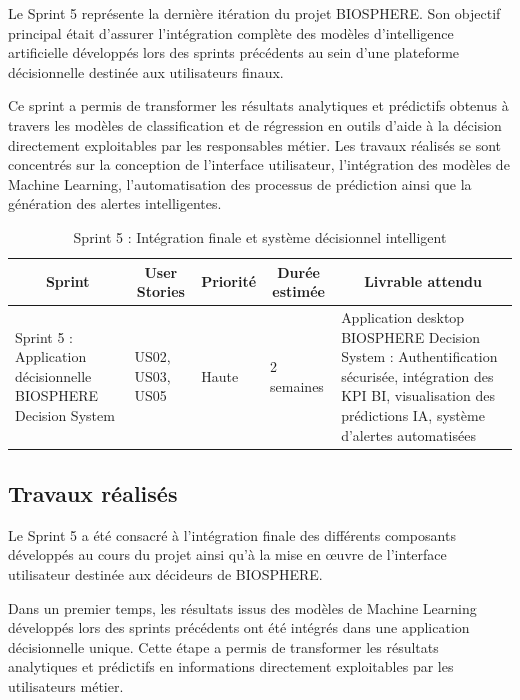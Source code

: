 Le Sprint 5 représente la dernière itération du projet BIOSPHERE. Son objectif principal était d'assurer l'intégration complète des modèles d'intelligence artificielle développés lors des sprints précédents au sein d'une plateforme décisionnelle destinée aux utilisateurs finaux.

Ce sprint a permis de transformer les résultats analytiques et prédictifs obtenus à travers les modèles de classification et de régression en outils d'aide à la décision directement exploitables par les responsables métier. Les travaux réalisés se sont concentrés sur la conception de l'interface utilisateur, l'intégration des modèles de Machine Learning, l'automatisation des processus de prédiction ainsi que la génération des alertes intelligentes.

\begin{table}[H]
\centering
\caption{Sprint 5 : Intégration finale et système décisionnel intelligent}
\label{tab:ch5:sprint5}
\small
\begin{tabular}{|p{3.5cm}|p{1.5cm}|p{1.5cm}|p{2.2cm}|p{5.5cm}|}
\hline
\multicolumn{1}{|c|}{\textbf{Sprint}} & 
\multicolumn{1}{c|}{\textbf{User Stories}} & 
\multicolumn{1}{c|}{\textbf{Priorité}} & 
\multicolumn{1}{c|}{\textbf{Durée estimée}} & 
\multicolumn{1}{c|}{\textbf{Livrable attendu}} \\
\hline
Sprint 5 : Application décisionnelle BIOSPHERE Decision System & US02, US03, US05 & Haute & 2 semaines & Application desktop BIOSPHERE Decision System : Authentification sécurisée, intégration des KPI BI, visualisation des prédictions IA, système d'alertes automatisées \\
\hline
\end{tabular}
\end{table}

\subsection{Travaux réalisés}

Le Sprint 5 a été consacré à l'intégration finale des différents composants développés au cours du projet ainsi qu'à la mise en œuvre de l'interface utilisateur destinée aux décideurs de BIOSPHERE.

Dans un premier temps, les résultats issus des modèles de Machine Learning développés lors des sprints précédents ont été intégrés dans une application décisionnelle unique. Cette étape a permis de transformer les résultats analytiques et prédictifs en informations directement exploitables par les utilisateurs métier.

